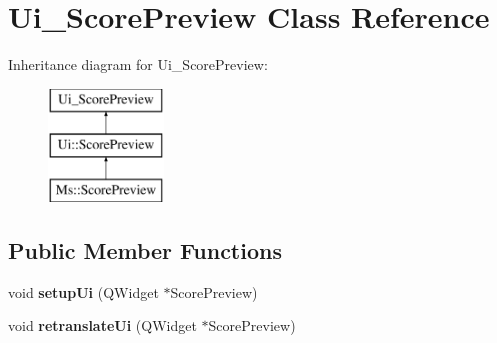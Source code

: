 \hypertarget{class_ui___score_preview}{}\section{Ui\+\_\+\+Score\+Preview Class Reference}
\label{class_ui___score_preview}
Inheritance diagram for Ui\+\_\+\+Score\+Preview\+:\begin{figure}[H]
\begin{center}
\leavevmode
\includegraphics[height=3.000000cm]{class_ui___score_preview}
\end{center}
\end{figure}
\subsection*{Public Member Functions}
\begin{DoxyCompactItemize}
\item 
\mbox{\label{class_ui___score_preview_a039bd2e632dfe9317d2560c95029b4e9}} 
void {\bfseries setup\+Ui} (Q\+Widget $\ast$Score\+Preview)
\item 
\mbox{\label{class_ui___score_preview_a35d2d3fd7f371ae5135eca9c05bbe038}} 
void {\bfseries retranslate\+Ui} (Q\+Widget $\ast$Score\+Preview)
\end{DoxyCompactItemize}
